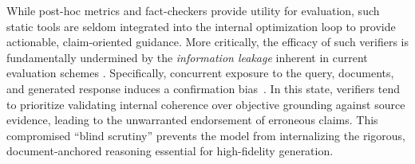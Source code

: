 \documentclass[10pt, a4paper, logo]{googledeepmind} %
\begin{document}

While post-hoc metrics and fact-checkers \citep{tang2024minicheck,rashkin2023measuring,gao-etal-2023-rarr,baker2025monitoringreasoningmodelsmisbehavior,guan2025monitoringmonitorability} provide utility for evaluation, such static tools are seldom integrated into the internal optimization loop to provide actionable, claim-oriented guidance. More critically, the efficacy of such verifiers is fundamentally undermined by the 
\textit{information leakage} inherent in current evaluation schemes \citep{seo2025verifyingverifiersunveilingpitfalls}. 
Specifically, concurrent exposure to the query, documents, and generated response induces a confirmation bias~\citep{sharma2025understandingsycophancylanguagemodels}. In this state, verifiers tend to prioritize validating internal coherence over objective grounding against source evidence, leading to the unwarranted endorsement of erroneous claims. This compromised ``blind scrutiny'' prevents the model from internalizing the rigorous, document-anchored reasoning essential for high-fidelity generation.



\end{document}

